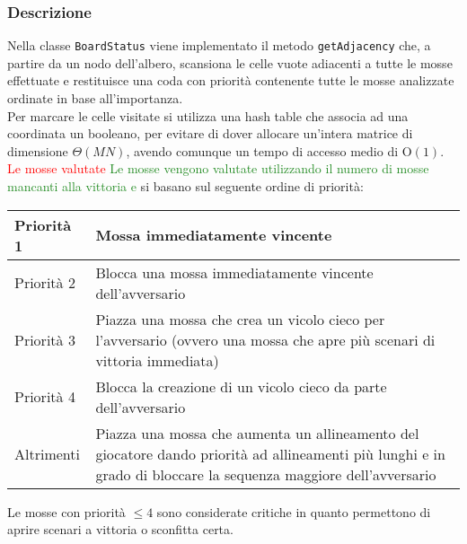 \documentclass[11pt]{article}
\begin{document}
\subsubsection*{Descrizione}
Nella classe \texttt{BoardStatus} viene implementato il metodo \texttt{getAdjacency} che, a partire da un nodo dell'albero, scansiona le celle vuote adiacenti a tutte le mosse effettuate e restituisce una coda con priorità contenente tutte le mosse analizzate ordinate in base all'importanza.\\
Per marcare le celle visitate si utilizza una hash table che associa ad una coordinata un booleano, per evitare di dover allocare un'intera matrice di dimensione $\Theta(MN)$, avendo comunque un tempo di accesso medio di O$(1)$.\\
\textcolor{red}{ Le mosse valutate }
\textcolor{ForestGreen}{ Le mosse vengono valutate utilizzando il numero di mosse mancanti alla vittoria e } si basano sul seguente ordine di priorità:
\begin{table}[H]	%
\centering			%
\def\arraystretch{1.5}
\begin{tabular}{|l|p{3in}|}	%
\hline	%
Priorità 1 & Mossa immediatamente vincente \\ \hline
Priorità 2 & Blocca una mossa immediatamente vincente dell'avversario \\ \hline
Priorità 3 & Piazza una mossa che crea un vicolo cieco per l'avversario (ovvero una mossa che apre più scenari di vittoria immediata) \\ \hline
Priorità 4 & Blocca la creazione di un vicolo cieco da parte dell'avversario \\ \hline
Altrimenti & Piazza una mossa che aumenta un allineamento del giocatore dando priorità ad allineamenti più lunghi e in grado di bloccare la sequenza maggiore dell'avversario \\ \hline
\end{tabular}
\end{table}
$ $\\
Le mosse con priorità $\leq 4$ sono considerate critiche in quanto permettono di aprire scenari a vittoria o sconfitta certa.
\end{document}
